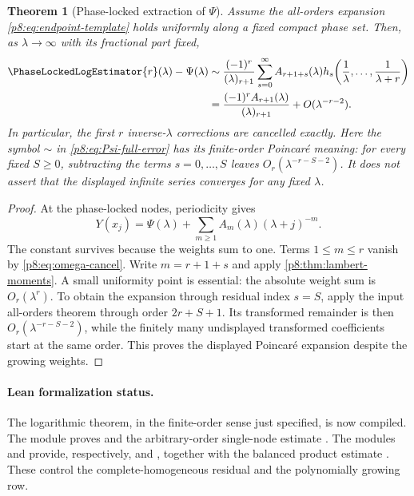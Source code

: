 \documentclass[11pt]{article}
\numberwithin{equation}{section}
\newtheorem{theorem}{Theorem}[section]
\theoremstyle{definition}
\theoremstyle{remark}
\begin{document}
\begin{theorem}[Phase-locked extraction of $\Psi$]
\label{p8:thm:Psi-extraction}
Assume the all-orders expansion \cref{p8:eq:endpoint-template} holds uniformly along a fixed compact phase set. Then, as $\lambda\to\infty$ with its fractional part fixed,
\begin{align}
\PhaseLockedLogEstimator{r}(\lambda)-\Psi(\lambda)
&\sim \frac{(-1)^r}{(\lambda)_{r+1}}
\sum_{s=0}^{\infty}A_{r+1+s}(\lambda)
 h_s\!\left(\frac1\lambda,\ldots,\frac1{\lambda+r}\right)
\label{p8:eq:Psi-full-error}\\
&=\frac{(-1)^rA_{r+1}(\lambda)}{(\lambda)_{r+1}}
+O(\lambda^{-r-2}).
\label{p8:eq:Psi-leading-error}
\end{align}
In particular, the first $r$ inverse-$\lambda$ corrections are cancelled exactly.
Here the symbol $\sim$ in \eqref{p8:eq:Psi-full-error} has its finite-order
Poincar\'e meaning: for every fixed $S\ge0$, subtracting the terms
$s=0,\ldots,S$ leaves $O_r(\lambda^{-r-S-2})$.  It does not assert that the
displayed infinite series converges for any fixed $\lambda$.
\end{theorem}

\begin{proof}
At the phase-locked nodes, periodicity gives
\[
Y(x_j)=\Psi(\lambda)+\sum_{m\ge1}A_m(\lambda)(\lambda+j)^{-m}.
\]
The constant survives because the weights sum to one. Terms $1\le m\le r$ vanish by \cref{p8:eq:omega-cancel}. Write $m=r+1+s$ and apply \cref{p8:thm:lambert-moments}. A small uniformity point is essential: the absolute weight sum is $O_r(\lambda^r)$. To obtain the expansion through residual index $s=S$, apply the input all-orders theorem through order $2r+S+1$. Its transformed remainder is then $O_r(\lambda^{-r-S-2})$, while the finitely many undisplayed transformed coefficients start at the same order. This proves the displayed Poincar\'e expansion despite the growing weights.
\end{proof}

\paragraph{Lean formalization status.}
The logarithmic theorem, in the finite-order sense just specified, is now
compiled.  The module  proves
 and the arbitrary-order
single-node estimate
.
The modules  and
 provide, respectively,
 and
, together
with the balanced product estimate
.  These control
the complete-homogeneous residual and the polynomially growing row.
\end{document}
